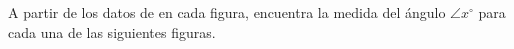 \documentclass[11pt,addpoints]{exam}
\begin{document}

\begin{questions}
  
  \newpage
  
  \newpage
  
  
  
  \newpage
  

  

  

  


  \question[10] A partir de los datos de en cada figura, encuentra la medida del \'angulo $\angle x^\circ$ para cada una de las siguientes figuras.


\end{questions}
\end{document}
